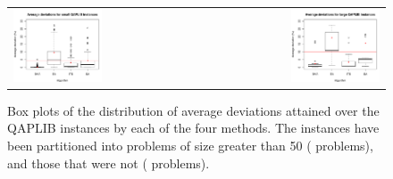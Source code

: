 \begin{figure}
    \begin{tabularx}{\textwidth}{@{}lr@{}}
        \includegraphics[width=0.5\textwidth]{figures/results-deviations-small-box-plot.pdf} &
        \includegraphics[width=0.5\textwidth]{figures/results-deviations-large-box-plot.pdf}
    \end{tabularx}
    \caption{
        Box plots of the distribution of average deviations attained over the QAPLIB instances by each of the four methods.
        The instances have been partitioned into problems of size greater than 50 ( problems), and those that were not ( problems).
    }
    \label{tab:results-deviations-types}
\end{figure}




